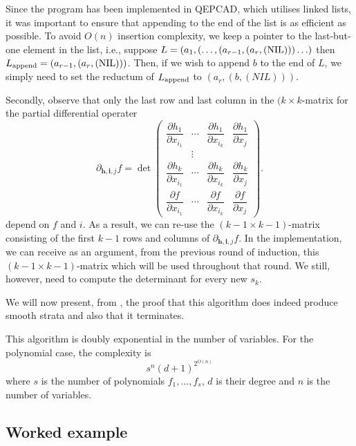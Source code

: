 \documentclass[
]{book}
\theoremstyle{definition}
\theoremstyle{definition}
\theoremstyle{definition}
\theoremstyle{definition}
\theoremstyle{remark}
\begin{document}
Since the program has been implemented in QEPCAD, which utilises linked lists, it was important to ensure that appending to the end of the list is as efficient as possible. To avoid \(O(n)\) insertion complexity, we keep a pointer to the last-but-one element in the list, i.e., suppose \(L = (a_1,(\ldots,(a_{r-1},(a_r,(\rm{NIL})))\ldots)\) then \(L_{\rm{append}} = (a_{r-1},(a_r,(\rm{NIL})))\). Then, if we wish to append \(b\) to the end of \(L\), we simply need to set the reductum of \(L_{\rm{append}}\) to \((a_r,(b,(NIL)))\).

Secondly, observe that only the last row and last column in the \((k\times k\)-matrix for the partial differential operater
\[
\partial_{\mathbf{h},\mathbf{i},j} f = \det\begin{pmatrix}\dfrac{\partial h_{1}}{\partial x_{i_{1}}} & \cdots & \dfrac{\partial h_{1}}{\partial x_{i_{k}}} & \dfrac{\partial h_{1}}{\partial x_{j}}\\
 & \vdots\\
\dfrac{\partial h_{k}}{\partial x_{i_{1}}} & \cdots & \dfrac{\partial h_{k}}{\partial x_{i_{k}}} & \dfrac{\partial h_{k}}{\partial x_{j}}\\
\dfrac{\partial f}{\partial x_{i_{1}}} & \cdots & \dfrac{\partial f}{\partial x_{i_{k}}} & \dfrac{\partial f}{\partial x_{j}}
\end{pmatrix}.
\]
depend on \(f\) and \(i\). As a result, we can re-use the \((k-1\times k-1)\)-matrix consisting of the first \(k-1\) rows and columns of \(\partial_{\mathbf{h}, \mathbf{i}, j} f\).
In the implementation, we can receive as an argument, from the previous round of induction, this \((k-1\times k-1)\)-matrix which will be used throughout that round. We still, however, need to compute the determinant for every new \(s_k\).

We will now present, from \citep[Theorem 1]{gv1995}, the proof that this algorithm does indeed produce smooth strata and also that it terminates.

This algorithm is doubly exponential in the number of variables. For the polynomial case, the complexity is
\[
s^n (d+1)^{2^{O(n)}}
\]
where \(s\) is the number of polynomials \(f_1,\ldots,f_s\), \(d\) is their degree and \(n\) is the number of variables. \citep[Section 4]{gv1995}

\hypertarget{worked-example}{%
\subsection{Worked example}\label{worked-example}}
\end{document}
